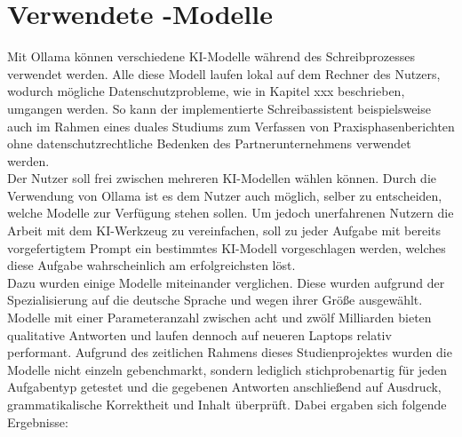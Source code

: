 \documentclass[../main.tex]{subfiles}
\begin{document}
\section{Verwendete -Modelle}

Mit Ollama können verschiedene KI-Modelle während des Schreibprozesses verwendet werden. Alle diese Modell laufen lokal auf dem Rechner des Nutzers, wodurch mögliche Datenschutzprobleme, 
wie in Kapitel xxx beschrieben, umgangen werden. So kann der implementierte Schreibassistent beispielsweise auch im Rahmen eines duales Studiums zum Verfassen von 
Praxisphasenberichten ohne datenschutzrechtliche Bedenken des Partnerunternehmens verwendet werden.\\ 
Der Nutzer soll frei zwischen mehreren KI-Modellen wählen können. Durch die Verwendung von Ollama ist es dem Nutzer auch möglich, selber zu entscheiden, welche Modelle zur Verfügung 
stehen sollen. Um jedoch unerfahrenen Nutzern die Arbeit mit dem KI-Werkzeug zu vereinfachen, soll zu jeder Aufgabe mit bereits vorgefertigtem Prompt ein bestimmtes KI-Modell 
vorgeschlagen werden, welches diese Aufgabe wahrscheinlich am erfolgreichsten löst.\\ 
Dazu wurden einige Modelle miteinander verglichen. Diese wurden aufgrund der Spezialisierung auf die deutsche Sprache und wegen ihrer Größe ausgewählt. Modelle mit einer 
Parameteranzahl zwischen acht und zwölf Milliarden bieten qualitative Antworten und laufen dennoch auf neueren Laptops relativ performant. Aufgrund des zeitlichen Rahmens dieses 
Studienprojektes wurden die Modelle nicht einzeln gebenchmarkt, sondern lediglich stichprobenartig für jeden Aufgabentyp getestet und die gegebenen Antworten anschließend auf 
Ausdruck, grammatikalische Korrektheit und Inhalt überprüft. Dabei ergaben sich folgende Ergebnisse: 
\end{document}
